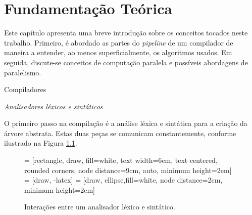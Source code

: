 \chapter{Fundamentação Teórica}

Este capítulo apresenta uma breve introdução sobre os conceitos tocados neste
trabalho. Primeiro, é abordado as partes do \textit{pipeline} de um compilador
de maneira a entender, ao menos superficialmente, os algoritmos usados.
Em seguida, discute-se conceitos de computação paralela e possíveis abordagens
de paralelismo.

\begin{section}{Compiladores}

\begin{subsection}{\textit{Analisadores léxicos e sintáticos}}

O primeiro passo na compilação é a análise léxica e sintática para a criação
da árvore abstrata. Estas duas peças se comunicam constantemente, conforme
ilustrado na Figura \ref{fig:lexico_sintatico}.

\begin{figure}
 = [rectangle, draw, fill=white,
    text width=6em, text centered, rounded corners, node distance=9cm, auto, minimum height=2em]
 = [draw, -latex]
 = [draw, ellipse,fill=white, node distance=2cm,
    minimum height=2em]

\begin{center}
\end{center}

\caption{Interações entre um analisador léxico e sintático.}
\label{fig:lexico_sintatico}
\end{figure}


\end{subsection}
\end{section}
